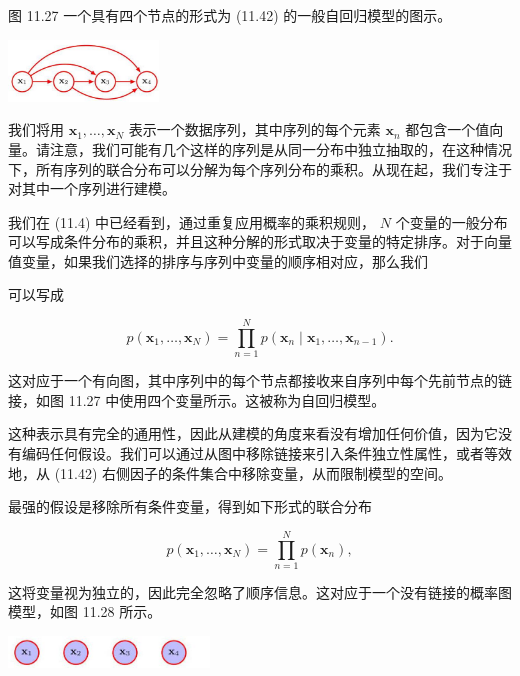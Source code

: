 \documentclass[10pt]{report}
\begin{document}
图 11.27 一个具有四个节点的形式为 (11.42) 的一般自回归模型的图示。

\begin{center}
\includegraphics[max width=0.3\textwidth]{images/0194e279-9b28-703a-88f4-c3ac21e2010d_369_1079_368_472_194_0.jpg}
\end{center}
\hspace*{3em} 

我们将用 \({\mathbf{x}}_{1},\ldots ,{\mathbf{x}}_{N}\) 表示一个数据序列，其中序列的每个元素 \({\mathbf{x}}_{n}\) 都包含一个值向量。请注意，我们可能有几个这样的序列是从同一分布中独立抽取的，在这种情况下，所有序列的联合分布可以分解为每个序列分布的乘积。从现在起，我们专注于对其中一个序列进行建模。

我们在 (11.4) 中已经看到，通过重复应用概率的乘积规则， \(N\) 个变量的一般分布可以写成条件分布的乘积，并且这种分解的形式取决于变量的特定排序。对于向量值变量，如果我们选择的排序与序列中变量的顺序相对应，那么我们

可以写成

\[
p\left( {{\mathbf{x}}_{1},\ldots ,{\mathbf{x}}_{N}}\right)  = \mathop{\prod }\limits_{{n = 1}}^{N}p\left( {{\mathbf{x}}_{n} \mid  {\mathbf{x}}_{1},\ldots ,{\mathbf{x}}_{n - 1}}\right) . \tag{11.42}
\]

这对应于一个有向图，其中序列中的每个节点都接收来自序列中每个先前节点的链接，如图 11.27 中使用四个变量所示。这被称为自回归模型。

这种表示具有完全的通用性，因此从建模的角度来看没有增加任何价值，因为它没有编码任何假设。我们可以通过从图中移除链接来引入条件独立性属性，或者等效地，从 (11.42) 右侧因子的条件集合中移除变量，从而限制模型的空间。

最强的假设是移除所有条件变量，得到如下形式的联合分布

\[
p\left( {{\mathbf{x}}_{1},\ldots ,{\mathbf{x}}_{N}}\right)  = \mathop{\prod }\limits_{{n = 1}}^{N}p\left( {\mathbf{x}}_{n}\right) , \tag{11.43}
\]

这将变量视为独立的，因此完全忽略了顺序信息。这对应于一个没有链接的概率图模型，如图 11.28 所示。

\begin{center}
\includegraphics[max width=0.4\textwidth]{images/0194e279-9b28-703a-88f4-c3ac21e2010d_370_938_346_535_86_0.jpg}
\end{center}
\hspace*{3em} 
\end{document}
